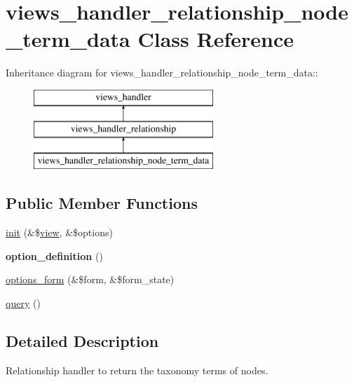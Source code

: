 \hypertarget{classviews__handler__relationship__node__term__data}{
\section{views\_\-handler\_\-relationship\_\-node\_\-term\_\-data Class Reference}
\label{classviews__handler__relationship__node__term__data}
}
Inheritance diagram for views\_\-handler\_\-relationship\_\-node\_\-term\_\-data::\begin{figure}[H]
\begin{center}
\leavevmode
\includegraphics[height=3cm]{classviews__handler__relationship__node__term__data}
\end{center}
\end{figure}
\subsection*{Public Member Functions}
\begin{DoxyCompactItemize}
\item 
\hyperlink{classviews__handler__relationship__node__term__data_a85e3c68c3338ca221d436eb13914bd68}{init} (\&\$\hyperlink{classview}{view}, \&\$options)
\item 
\hypertarget{classviews__handler__relationship__node__term__data_aa8355fc1765b7c1930a5a79518fffc2d}{
{\bfseries option\_\-definition} ()}
\label{classviews__handler__relationship__node__term__data_aa8355fc1765b7c1930a5a79518fffc2d}

\item 
\hyperlink{classviews__handler__relationship__node__term__data_a976c536bb78f58c8919b95917a84d2bd}{options\_\-form} (\&\$form, \&\$form\_\-state)
\item 
\hyperlink{classviews__handler__relationship__node__term__data_a52e14dbfdfd8ca850baa9fbd4880836d}{query} ()
\end{DoxyCompactItemize}


\subsection{Detailed Description}
Relationship handler to return the taxonomy terms of nodes. 


